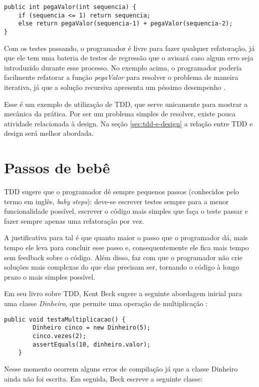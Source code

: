 \begin{lstlisting}[frame=trbl]
public int pegaValor(int sequencia) {
	if (sequencia <= 1) return sequencia;
    else return pegaValor(sequencia-1) + pegaValor(sequencia-2);
}
\end{lstlisting}

Com os testes passando, o programador é livre para fazer qualquer refatoração, já que ele tem uma bateria de testes de regressão que o
avisará caso algum erro seja introduzido durante esse processo. No exemplo acima, o programador poderia facilmente refatorar a função
\textit{pegaValor} para resolver o problema de maneira iterativa, já que a solução recursiva apresenta um péssimo desempenho \cite{clrs}.
 
Esse é um exemplo de utilização de TDD, que serve unicamente para mostrar a mecânica da prática. Por ser um problema simples de resolver,
existe pouca atividade relacionada à design. Na seção \ref{sec:tdd-e-design} a relação entre TDD e design será melhor abordada.

\section{Passos de bebê}
\label{sec:tdd-baby-steps}

TDD sugere que o programador dê sempre pequenos passos (conhecidos pelo termo em inglês, \textit{baby steps}): deve-se escrever testes 
sempre para a menor funcionalidade possível, escrever o código mais simples que faça o teste passar e fazer sempre 
apenas uma refatoração por vez. 

A justificativa para tal é que quanto maior o passo que o programador dá, mais tempo ele leva para concluir esse passo e, 
consequentemente ele fica mais tempo sem feedback sobre o código. Além disso, faz com que o programador não crie 
soluções mais complexas do que elas precisam ser, tornando o código à longo prazo o mais simples possível.

Em seu livro sobre TDD, Kent Beck sugere a seguinte abordagem inicial para uma classe \textit{Dinheiro}, que permite uma operação de 
multiplicação \cite{TDDByExample}:

\begin{lstlisting}[frame=trbl]
    public void testaMultiplicacao() {
		Dinheiro cinco = new Dinheiro(5);
		cinco.vezes(2);
		assertEquals(10, dinheiro.valor);
	}
\end{lstlisting}

Nesse momento ocorrem alguns erros de compilação já que a classe Dinheiro ainda não foi escrita. Em seguida, Beck escreve
a seguinte classe:

